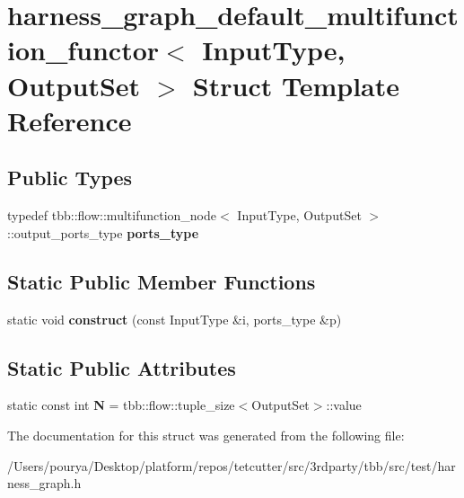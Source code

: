 \hypertarget{structharness__graph__default__multifunction__functor}{}\section{harness\+\_\+graph\+\_\+default\+\_\+multifunction\+\_\+functor$<$ Input\+Type, Output\+Set $>$ Struct Template Reference}
\label{structharness__graph__default__multifunction__functor}
\subsection*{Public Types}
\begin{DoxyCompactItemize}
\item 
\hypertarget{structharness__graph__default__multifunction__functor_a956e5cbceb209e3932ceca67ace6f222}{}typedef tbb\+::flow\+::multifunction\+\_\+node$<$ Input\+Type, Output\+Set $>$\+::output\+\_\+ports\+\_\+type {\bfseries ports\+\_\+type}\label{structharness__graph__default__multifunction__functor_a956e5cbceb209e3932ceca67ace6f222}

\end{DoxyCompactItemize}
\subsection*{Static Public Member Functions}
\begin{DoxyCompactItemize}
\item 
\hypertarget{structharness__graph__default__multifunction__functor_a06b35ccc3bcb19ccbedcb3096fbd8b9e}{}static void {\bfseries construct} (const Input\+Type \&i, ports\+\_\+type \&p)\label{structharness__graph__default__multifunction__functor_a06b35ccc3bcb19ccbedcb3096fbd8b9e}

\end{DoxyCompactItemize}
\subsection*{Static Public Attributes}
\begin{DoxyCompactItemize}
\item 
\hypertarget{structharness__graph__default__multifunction__functor_a83f679d063940cec991b383c42e82561}{}static const int {\bfseries N} = tbb\+::flow\+::tuple\+\_\+size$<$Output\+Set$>$\+::value\label{structharness__graph__default__multifunction__functor_a83f679d063940cec991b383c42e82561}

\end{DoxyCompactItemize}


The documentation for this struct was generated from the following file\+:\begin{DoxyCompactItemize}
\item 
/\+Users/pourya/\+Desktop/platform/repos/tetcutter/src/3rdparty/tbb/src/test/harness\+\_\+graph.\+h\end{DoxyCompactItemize}

